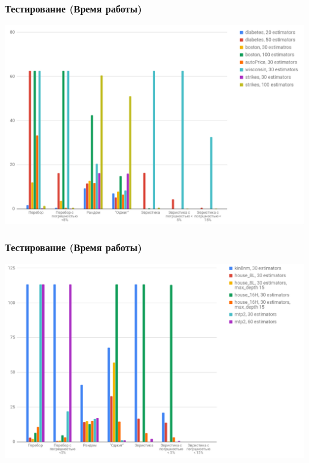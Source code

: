 \documentclass{beamer}
\begin{document}

\begin{frame}
    \frametitle{Тестирование (Время работы)}
    \begin{center}
    \includegraphics[width=\textwidth]{graph_time1.png}
    \end{center}
\end{frame}

\begin{frame}
    \frametitle{Тестирование (Время работы)}
    \begin{center}
    \includegraphics[width=\textwidth]{graph_time2.png}
    \end{center}
\end{frame}
\end{document}
